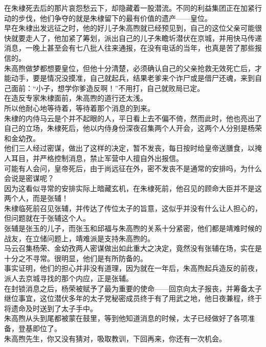 \begin{multicols}{\theparacolNo}
在朱棣死去后的那片哀怨愁云下，却隐藏着一股潜流。不同的利益集团正在加紧行动的步伐，他们争夺的就是朱棣留下的最有价值的遗产——皇位。\\

早在朱棣出发远征之时，他的好儿子朱高煦就已经预见到，自己的这位父亲可能很快就要走人了，他加紧了筹划，派出自己的儿子朱瞻圻潜伏在京城，并用快马传递消息，一晚上甚至会有七八批人往来通报，在没有电话的当年，也真是苦了那些报信的。\\

朱高煦做梦都想要皇位，但他十分清楚，必须确认自己的父亲抢救无效死亡后，才能动手，要是情况没摸准，自己就起兵，结果老爹来个诈尸或是借尸还魂，来到自己面前：“小子，想学你爹造反啊！”不用打，自己就败局已定。\\

在造反专家朱棣面前，朱高煦的道行还太浅。\\

所以他耐心地等待着，等待着那个消息的到来。\\

朱棣的内侍马云是个并不起眼的人，平日看上去不偏不倚，然而此时，他也亮出了自己的立场，朱棣死后，他以内侍身份深夜召集两个人开会，这两个人分别是杨荣和金幼孜。\\

他们三人经过密谋，做出了这样的决定，暂不发丧，每日按时给皇帝送膳食，以掩人耳目，并严格控制消息，禁止军营中人擅自外出报信。\\

可能有人会问，皇帝死后，由于尚远征在外，密不发丧不是通常的安排吗，为什么会说是密谋呢？\\

因为这看似寻常的安排实际上暗藏玄机，在朱棣死前，他召见的顾命大臣并不是这两个人，而是张辅！\\

朱棣临死前召见张辅，并传达了传位太子的旨意，这似乎并没有什么让人担心的，但问题就在于张辅这个人。\\

张辅是张玉的儿子，而张玉和邱福与朱高煦的关系十分紧密，他们都是靖难时候的战友，在立储问题上，靖难派是支持朱高煦的。\\

马云召集杨荣、金幼孜两人密谋做出如此重大之决定，竟然没有张辅在场，实在是十分之不寻常。很明显，他们是有所防备的。\\

事实证明，他们的担心并非没有道理，因为就在一年后，朱高煦起兵造反的前夜，派人去京城寻找的那个内应，正是张辅。\\

在封锁消息之后，杨荣被赋予了最为重要的使命——回京向太子报丧，并筹备太子继位事宜，这位潜伏多年的太子党秘密成员终于有了用武之地，他日夜兼程，终于将遗命及时送到了太子手中。\\

朱高煦从头到尾都被蒙在鼓里，等到他知道消息的时候，太子已经做好了各项准备，登基即位了。\\

朱高煦先生，你又没有猜对，吸取教训，下回再来，你还有一次机会。\\

\ifnum{}
	\end{multicols}
\fi
\newpage

